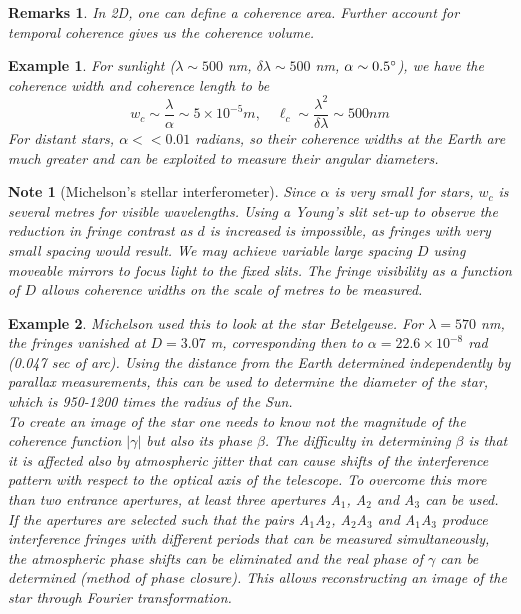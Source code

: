 \documentclass[a4paper]{article}
\newtheorem{remarks}{Remarks}[section]
\newtheorem{eg}{Example}[section]
\newtheorem{Note}{Note}[section]
\theoremstyle{new}
\begin{document}
\begin{remarks}
In 2D, one can define a coherence area. Further account for temporal coherence gives us the coherence volume.
\end{remarks}
\begin{eg}
For sunlight ($\lambda\sim 500$ nm, $\delta\lambda\sim 500$ nm, $\alpha\sim 0.5\degree$), we have the coherence width and coherence length to be
$$w_c\sim\frac{\lambda}{\alpha}\sim 5\times10^{-5}m,\quad\ell_c\sim\frac{\lambda^2}{\delta\lambda}\sim 500 nm$$
For distant stars, $\alpha<<0.01$ radians, so their coherence widths at the Earth are much greater and can be exploited to measure their angular diameters.
\end{eg}
\begin{Note}[Michelson's stellar interferometer]
Since $\alpha$ is very small for stars, $w_c$ is several metres for visible wavelengths. Using a Young's slit set-up to observe the reduction in fringe contrast as $d$ is increased is impossible, as fringes with very small spacing would result. We may achieve variable large spacing $D$ using moveable mirrors to focus light to the fixed slits. The fringe visibility as a function of $D$ allows coherence widths on the scale of metres to be measured.
\end{Note}
\begin{eg}
Michelson used this to look at the star Betelgeuse. For $\lambda = 570$ nm, the fringes vanished at $D = 3.07$ m, corresponding then to $\alpha=22.6\times10^{-8}$ rad (0.047 sec of arc). Using the distance from the Earth determined independently by parallax measurements, this can be used to determine the diameter of the star, which is 950-1200 times the radius of the Sun.\\[5pt]
To create an image of the star one needs to know not the magnitude of the coherence function $|\gamma|$ but also its phase $\beta$. The difficulty in determining $\beta$ is that it is affected also by atmospheric jitter that can cause shifts of the interference pattern with respect to the optical axis of the telescope. To overcome this more than two entrance apertures, at least three apertures A$_1$, A$_2$ and A$_3$ can be used. If the apertures are selected such that the pairs A$_1$A$_2$, A$_2$A$_3$ and A$_1$A$_3$ produce interference fringes with different periods that can be measured simultaneously, the atmospheric phase shifts can be eliminated and the real phase of $\gamma$ can be determined (method of phase closure). This allows reconstructing an image of the star through Fourier transformation.
\end{eg}
\newpage
\end{document}
